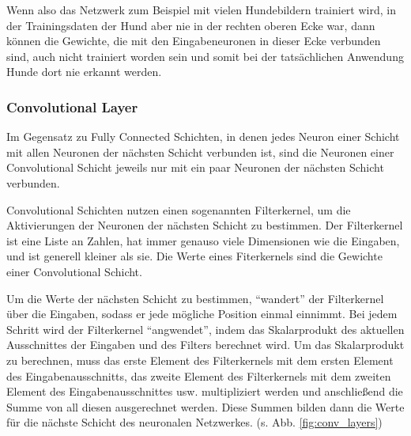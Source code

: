 \documentclass[10pt]{article}
\newcommand{\feng}[1]{{#1}}
\begin{document}
Wenn also das Netzwerk zum Beispiel mit vielen Hundebildern trainiert wird, in der Trainingsdaten der Hund aber nie in der rechten oberen Ecke war, dann können die Gewichte, die mit den Eingabeneuronen in dieser Ecke verbunden sind, auch nicht trainiert worden sein und somit bei der tatsächlichen Anwendung Hunde dort nie erkannt werden.


\subsubsection{Convolutional Layer}

Im Gegensatz zu Fully Connected Schichten, in denen jedes Neuron einer Schicht mit allen Neuronen der nächsten Schicht verbunden ist, sind die Neuronen einer Convolutional Schicht jeweils nur mit ein paar Neuronen der nächsten Schicht verbunden.

Convolutional Schichten nutzen einen sogenannten Filterkernel, um die Aktivierungen der Neuronen der nächsten Schicht zu bestimmen.
Der Filterkernel ist eine Liste an Zahlen, hat immer genauso viele Dimensionen wie die Eingaben, und ist generell kleiner als sie.
Die Werte eines Fiterkernels sind die Gewichte einer Convolutional Schicht.

Um die Werte der nächsten Schicht zu bestimmen, \enquote{wandert} der Filterkernel über die Eingaben, sodass er jede mögliche Position einmal einnimmt.
Bei jedem Schritt wird der Filterkernel \enquote{angwendet}, indem das Skalarprodukt des aktuellen Ausschnittes der Eingaben und des Filters berechnet wird. 
Um das Skalarprodukt zu berechnen, muss das erste Element des Filterkernels mit dem ersten Element des Eingabenausschnitts, das zweite Element des Filterkernels mit dem zweiten Element des Eingabenausschnittes usw. multipliziert werden und anschließend die Summe von all diesen ausgerechnet werden.
Diese Summen bilden dann die Werte für die nächste Schicht des neuronalen Netzwerkes. (s. Abb. \ref{fig:conv_layers})
\end{document}
